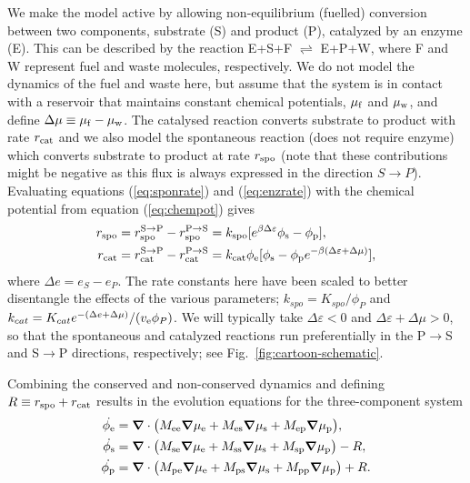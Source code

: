 We make the model active by allowing non-equilibrium (fuelled) conversion between two components, substrate (S) and product (P), catalyzed by an enzyme (E). This can be described by the reaction E+S+F $\rightleftharpoons$ E+P+W, where F and W represent fuel and waste molecules, respectively. We do not model the dynamics of the fuel and waste here, but assume that the system is in contact with a reservoir that maintains constant chemical potentials, $\mu_{\mathrm{f}}$ and $\mu_{\mathrm{w}}$, and define $\Delta\mu \equiv \mu_{\mathrm{f}}-\mu_{\mathrm{w}}$. The catalysed reaction converts substrate to product with rate $r_{\mathrm{cat}}$ and we also model the spontaneous reaction (does not require enzyme) which converts substrate to product at rate $r_{\mathrm{spo}}$ (note that these contributions might be negative as this flux is always expressed in the direction $S \rightarrow P$). Evaluating equations (\ref{eq:sponrate}) and (\ref{eq:enzrate}) with the chemical potential from equation (\ref{eq:chempot}) gives
\begin{align}
    r_{\mathrm{spo}} &= r_{\mathrm{spo}}^{\mathrm{S}\to\mathrm{P}} - r_{\mathrm{spo}}^{\mathrm{P}\to\mathrm{S}} = k_{\mathrm{spo}}[e^{\beta \Delta \varepsilon}\phi_{\mathrm{s}} - \phi_{\mathrm{p}}],\\
    r_{\mathrm{cat}} &= r_{\mathrm{cat}}^{\mathrm{S}\to\mathrm{P}} - r_{\mathrm{cat}}^{\mathrm{P}\to\mathrm{S}} = k_{\mathrm{cat}}\phi_{\mathrm{e}}[\phi_{\mathrm{s}}-\phi_{\mathrm{p}} e^{-\beta(\Delta \varepsilon+ \Delta\mu)}],
    \label{r_cat}
\end{align}
where $\Delta e = e_S - e_P$. The rate constants here have been scaled to better disentangle the effects of the various parameters; $k_{spo} = K_{spo}/\phi_P$ and $k_{cat} = K_{cat}e^{-(\Delta e + \Delta \mu)}/(v_{\mathrm{e}} \phi_P)$. We will typically take $\Delta \varepsilon<0$ and $\Delta \varepsilon + \Delta \mu>0$, so that the spontaneous and catalyzed reactions run preferentially in the P$\to$S and S$\to$P directions, respectively; see Fig.~\ref{fig:cartoon-schematic}.

Combining the conserved and non-conserved dynamics and defining $R\equiv r_{\mathrm{spo}}+r_{\mathrm{cat}}$ results in the evolution equations for the three-component system
\begin{align}
    \dot{\phi_{\mathrm{e}}} &= \bm{\nabla} \cdot \big(M_{\mathrm{ee}}\bm{\nabla}\mu_{\mathrm{e}} + M_{\mathrm{es}}\bm{\nabla}\mu_{\mathrm{s}} + M_{\mathrm{ep}}\bm{\nabla}\mu_{\mathrm{p}}\big), \label{eq:evoE}\\
    \dot{\phi_{\mathrm{s}}} &= \bm{\nabla} \cdot \big(M_{\mathrm{se}}\bm{\nabla}\mu_{\mathrm{e}} + M_{\mathrm{ss}}\bm{\nabla}\mu_{\mathrm{s}} + M_{\mathrm{sp}}\bm{\nabla}\mu_{\mathrm{p}}\big) - R, \label{eq:evoS}\\
    \dot{\phi_{\mathrm{p}}} &= \bm{\nabla} \cdot \big(M_{\mathrm{pe}}\bm{\nabla}\mu_{\mathrm{e}} + M_{\mathrm{ps}}\bm{\nabla}\mu_{\mathrm{s}} + M_{\mathrm{pp}}\bm{\nabla}\mu_{\mathrm{p}}\big) + R. \label{eq:evoP}
\end{align}

